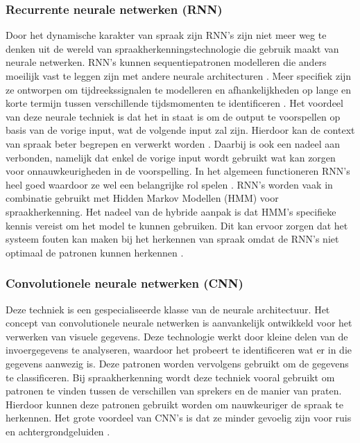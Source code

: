 \subsubsection{Recurrente neurale netwerken (RNN)}
Door het dynamische karakter van spraak zijn RNN's zijn niet meer weg te denken uit de wereld van spraakherkenningstechnologie die gebruik maakt van neurale netwerken. RNN's kunnen sequentiepatronen modelleren die anders moeilijk vast te leggen zijn met andere neurale architecturen \autocite{Mehrish2023}. Meer specifiek zijn ze ontworpen om tijdreekssignalen te modelleren en afhankelijkheden op lange en korte termijn tussen verschillende tijdsmomenten te identificeren \autocite{Papastratis2021}. Het voordeel van deze neurale techniek is dat het in staat is om de output te voorspellen op basis van de vorige input, wat de volgende input zal zijn. Hierdoor kan de context van spraak beter begrepen en verwerkt worden \autocite{Mehrish2023}. Daarbij is ook een nadeel aan verbonden, namelijk dat enkel de vorige input wordt gebruikt wat kan zorgen voor onnauwkeurigheden in de voorspelling. In het algemeen functioneren RNN's heel goed waardoor ze wel een belangrijke rol spelen \autocite{Papastratis2021}. RNN's worden vaak in combinatie gebruikt met Hidden Markov Modellen (HMM) voor spraakherkenning. Het nadeel van de hybride aanpak is dat HMM's specifieke kennis vereist om het model te kunnen gebruiken. Dit kan ervoor zorgen dat het systeem fouten kan maken bij het herkennen van spraak omdat de RNN's niet optimaal de patronen kunnen herkennen \autocite{Mehrish2023}.

\subsubsection{Convolutionele neurale netwerken (CNN)}
Deze techniek is een gespecialiseerde klasse van de neurale architectuur. Het concept van convolutionele neurale netwerken is aanvankelijk ontwikkeld voor het verwerken van visuele gegevens. Deze technologie werkt door kleine delen van de invoergegevens te analyseren, waardoor het probeert te identificeren wat er in die gegevens aanwezig is. Deze patronen worden vervolgens gebruikt om de gegevens te classificeren. Bij spraakherkenning wordt deze techniek vooral gebruikt om patronen te vinden tussen de verschillen van sprekers en de manier van praten. Hierdoor kunnen deze patronen gebruikt worden om nauwkeuriger de spraak te herkennen. Het grote voordeel van CNN's is dat ze minder gevoelig zijn voor ruis en achtergrondgeluiden \autocite{Mehrish2023}.


